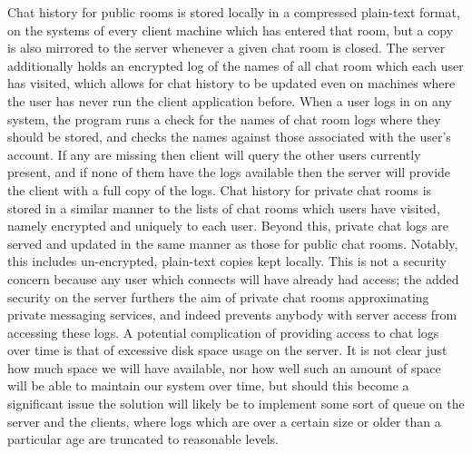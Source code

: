\documentclass[12pt]{report}
\begin{document}
\begin{flushleft}
\indent Chat history for public rooms is stored locally in a compressed plain-text format, on the systems of every client machine which has entered that room, but a copy is also mirrored to the server whenever a given chat room is closed. The server additionally holds an encrypted log of the names of all chat room which each user has visited, which allows for chat history to be updated even on machines where the user has never run the client application before. When a user logs in on any system, the program runs a check for  the names of chat room logs where they should be stored, and checks the names against those associated with the user's account. If any are missing then client will query the other users currently present, and if none of them have the logs available then the server will provide the client with a full copy of the logs. Chat history for private chat rooms is stored in a similar manner to the lists of chat rooms which users have visited, namely encrypted and uniquely to each user. Beyond this, private chat logs are served and updated in the same manner as those for public chat rooms. Notably, this includes un-encrypted, plain-text copies kept locally. This is not a security concern because any user which connects will have already had access; the added security on the server furthers the aim of private chat rooms approximating private messaging services, and indeed prevents anybody with server access from accessing these logs. A potential complication of providing access to chat logs over time is that of excessive disk space usage on the server. It is not clear just how much space we will have available, nor how well such an amount of space will be able to maintain our system over time, but should this become a significant issue the solution will likely be to implement some sort of queue on the server and the clients, where logs which are over a certain size or older than a particular age are truncated to reasonable levels.

\end{flushleft}
\end{document}
